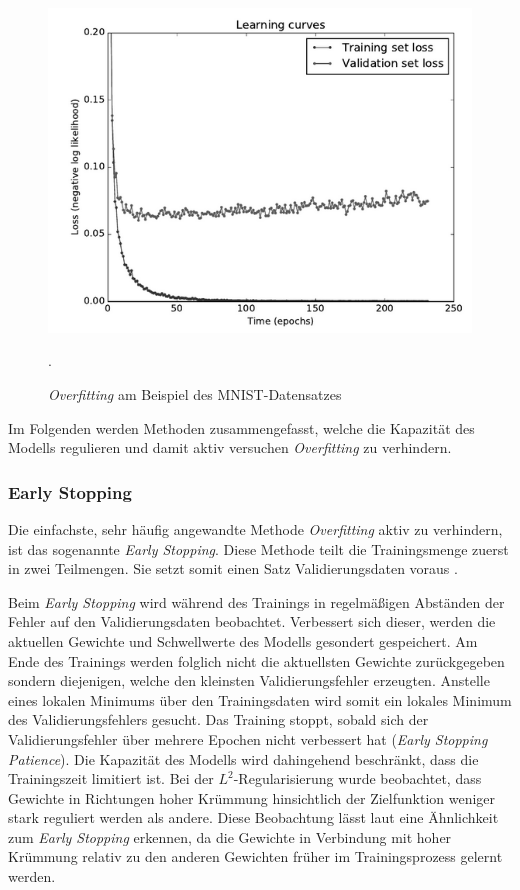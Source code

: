 \begin{figure}[H]
\centering
\includegraphics[width=0.4\linewidth]{images/4_overfitting}
\caption[]{\textit{Overfitting} am Beispiel des MNIST-Datensatzes \cite[siehe][Kap. 7.3, S. 216]{Bengio2015} }.
\label{fig:4_overfitting}
\end{figure}

Im Folgenden werden Methoden zusammengefasst, welche die Kapazität des Modells regulieren und damit aktiv versuchen \textit{Overfitting} zu verhindern.



\subsubsection{Early Stopping}
Die einfachste, sehr häufig angewandte Methode \textit{Overfitting} aktiv zu verhindern, ist das sogenannte \textit{Early Stopping}. Diese Methode teilt die Trainingsmenge zuerst in zwei Teilmengen. Sie setzt somit einen Satz Validierungsdaten voraus \cite[vgl. hierzu und im Folgenden][Kap. 7.3, S. 216 ff.]{Bengio2015}.

Beim \textit{Early Stopping} wird während des Trainings in regelmäßigen Abständen der Fehler auf den Validierungsdaten beobachtet. Verbessert sich dieser, werden die aktuellen Gewichte und Schwellwerte des Modells gesondert gespeichert. Am Ende des Trainings werden folglich nicht die aktuellsten Gewichte zurück\-gegeben sondern diejenigen, welche den kleinsten Validierungsfehler erzeugten.
Anstelle eines lokalen Minimums über den Trainingsdaten wird somit ein lokales Minimum des Validierungsfehlers gesucht. Das Training stoppt, sobald sich der Validierungsfehler über mehrere Epochen nicht verbessert hat (\textit{Early Stopping Patience}). Die Kapazität des Modells wird dahingehend beschränkt, dass die Trainingszeit limitiert ist.
Bei der $L^2$-Regularisierung wurde beobachtet, dass Gewichte in Richtungen hoher Krümmung hinsichtlich der Zielfunktion weniger stark reguliert werden als andere. Diese Beobachtung lässt laut \cite{Bengio2015} eine Ähnlichkeit zum \textit{Early Stopping} erkennen, da die Gewichte in Verbindung mit hoher Krümmung relativ zu den anderen Gewichten früher im Trainingsprozess gelernt werden.

